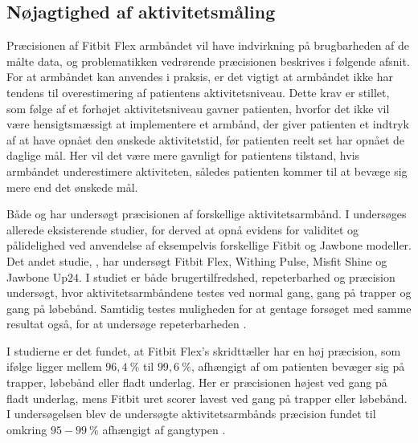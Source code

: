 \subsection{Nøjagtighed af aktivitetsmåling}

Præcisionen af Fitbit Flex armbåndet vil have indvirkning på brugbarheden af de målte data, og problematikken vedrørende præcisionen beskrives i følgende afsnit. For at armbåndet kan anvendes i praksis, er det vigtigt at armbåndet ikke har tendens til overestimering af patientens aktivitetsniveau. Dette krav er stillet, som følge af et forhøjet aktivitetsniveau gavner patienten, hvorfor det ikke vil være hensigtsmæssigt at implementere et armbånd, der giver patienten et indtryk af at have opnået den ønskede aktivitetstid, før patienten reelt set har opnået de daglige mål. Her vil det være mere gavnligt for patientens tilstand, hvis armbåndet underestimere aktiviteten, således patienten kommer til at bevæge sig mere end det ønskede mål.

Både \citeauthor{evenson2015} og \citeauthor{kaewkannate2016} har undersøgt præcisionen af forskellige aktivitetsarmbånd. I  undersøges allerede eksisterende studier, for derved at opnå evidens for validitet og pålidelighed ved anvendelse af eksempelvis forskellige Fitbit og Jawbone modeller. Det andet studie, , har undersøgt Fitbit Flex, Withing Pulse, Misfit Shine og Jawbone Up$24$. I studiet er både brugertilfredshed, repeterbarhed og præcision undersøgt, hvor aktivitetsarmbåndene testes ved normal gang, gang på trapper og gang på løbebånd. Samtidig testes muligheden for at gentage forsøget med samme resultat også, for at undersøge repeterbarheden \citep{evenson2015, kaewkannate2016}.

I studierne er det fundet, at Fitbit Flex's skridttæller har en høj præcision, som ifølge \citeauthor{kaewkannate2016} ligger mellem $96,4~\%$ til $99,6~\%$, afhængigt af om patienten bevæger sig på trapper, løbebånd eller fladt underlag. Her er præcisionen højest ved gang på fladt underlag, mens Fitbit uret scorer lavest ved gang på trapper eller løbebånd. I undersøgelsen blev de undersøgte aktivitetsarmbånds præcision fundet til omkring $95-99~\%$ afhængigt af gangtypen \citep{kaewkannate2016}.


